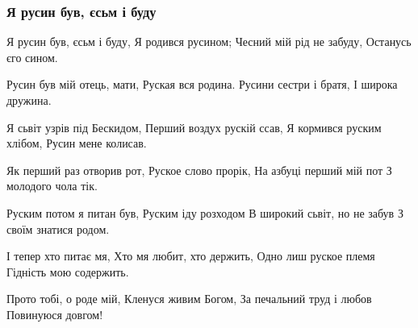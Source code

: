  
 
 

\subsubsection{Я русин був, єсьм і буду}
\label{sec:poetry.rus.oleksandr_duhnovych.ja_rusyn}

Я русин був, єсьм і буду,
Я родився русином;
Чесний мій рід не забуду,
Останусь єго сином.

Русин був мій отець, мати,
Руская вся родина.
Русини сестри і братя,
І широка дружина.

Я сьвіт узрів під Бескидом,
Перший воздух рускій ссав,
Я кормився руским хлібом,
Русин мене колисав.

Як перший раз отворив рот,
Руское слово прорік,
На азбуці перший мій пот
З молодого чола тік.

Руским потом я питан був,
Руским іду розходом
В широкий сьвіт, но не забув
З своїм знатися родом.

І тепер хто питає мя,
Хто мя любит, хто держить,
Одно лиш руское племя
Гідність мою содержить.

Прото тобі, о роде мій,
Кленуся живим Богом,
За печальний труд і любов
Повинуюся довгом!
